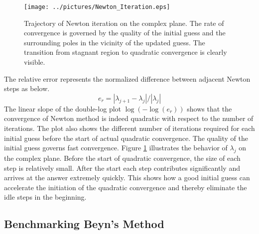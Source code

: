 \documentclass[11pt,letterpaper]{article}
\begin{document}
\begin{figure}\label{fig:NewtonIterate}
\begin{center}
\texttt{[image: ../pictures/Newton\_Iteration.eps]}
\end{center}
\caption{Trajectory of Newton iteration on the complex plane. \textnormal{The rate of convergence is governed by the quality of the initial guess and the surrounding poles in the vicinity of the updated guess. The transition from stagnant region to quadratic convergence is clearly visible.}} 
\end{figure}
The relative error represents the normalized difference between adjacent Newton steps as below.
\begin{equation}\label{eq:er}
e_r=|\lambda_{j+1} - \lambda_j|/|\lambda_j|
\end{equation}
The linear slope of the double-log plot $\log(-\log(e_r))$ shows that the convergence of Newton method is indeed quadratic with respect to the number of iterations. The plot also shows the different number of iterations required for each initial guess before the start of actual quadratic convergence. The quality of the initial guess governs fast convergence. Figure \ref{fig:NewtonIterate} illustrates the behavior of $\lambda_j$ on the complex plane. Before the start of quadratic convergence, the size of each step is relatively small. After the start each step contributes significantly and arrives at the answer extremely quickly. This shows how a good initial guess can accelerate the initiation of the quadratic convergence and thereby eliminate the idle steps in the beginning. 
\subsection{Benchmarking Beyn's Method}
\end{document}
